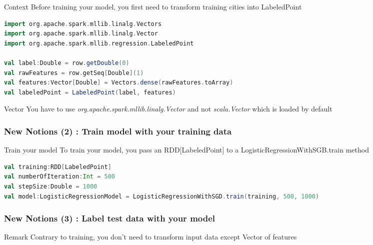 \documentclass[slidetop,9pt,utf8]{beamer}
\begin{document}
\begin{CJK}{UTF8}{gbsn}
\begin{frame}[fragile]
  \begin{block}{Context}
    Before training your model, you first need to transform training cities into LabeledPoint
  \end{block}

  \begin{lstlisting}[label=TransformDataToLinearRegression, caption=Transform row into LabeledPoint, language=scala, style=code]
import org.apache.spark.mllib.linalg.Vectors
import org.apache.spark.mllib.linalg.Vector
import org.apache.spark.mllib.regression.LabeledPoint

val label:Double = row.getDouble(0)
val rawFeatures = row.getSeq[Double](1)
val features:Vector[Double] = Vectors.dense(rawFeatures.toArray)
val labeledPoint = LabeledPoint(label, features)
  \end{lstlisting}

\begin{alertblock}{Vector}
  You have to use \textit{org.apache.spark.mllib.linalg.Vector} and not \textit{scala.Vector} which is loaded by default
\end{alertblock}

\end{frame}

\begin{frame}[fragile]
  \frametitle{New Notions (2) : Train model with your training data}

  \begin{block}{Train your model}
    To train your model, you pass an RDD[LabeledPoint] to a LogisticRegressionWithSGB.train method
  \end{block}

  \begin{lstlisting}[label=TrainModel, caption=Train your model, language=scala, style=code]
val training:RDD[LabeledPoint]
val numberOfIteration:Int = 500
val stepSize:Double = 1000
val model:LogisticRegressionModel = LogisticRegressionWithSGD.train(training, 500, 1000)
  \end{lstlisting}

\end{frame}

\begin{frame}[fragile]
  \frametitle{New Notions (3) : Label test data with your model}

  \begin{block}{Remark}
    Contrary to training, you don't need to transform input data except Vector of features
  \end{block}


\end{frame}
\end{CJK}
\end{document}
